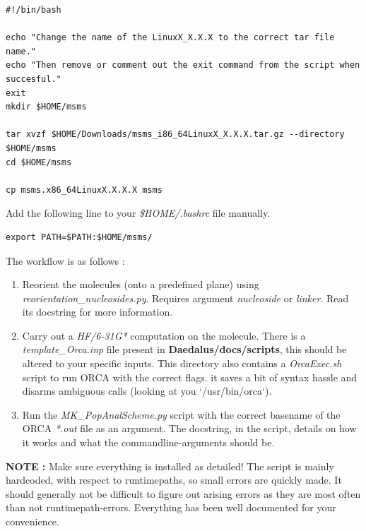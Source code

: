 \documentclass[a4paper]{article}
\begin{document}
\begin{tcolorbox}
\begin{verbatim}
#!/bin/bash

echo "Change the name of the LinuxX_X.X.X to the correct tar file name."
echo "Then remove or comment out the exit command from the script when succesful."
exit
mkdir $HOME/msms

tar xvzf $HOME/Downloads/msms_i86_64LinuxX_X.X.X.tar.gz --directory $HOME/msms 
cd $HOME/msms

cp msms.x86_64LinuxX.X.X.X msms
\end{verbatim}
\end{tcolorbox}
%
\noindent Add the following line to your \textit{\$HOME/.bashrc}  file manually.
\begin{tcolorbox}
\begin{verbatim}
export PATH=$PATH:$HOME/msms/
\end{verbatim}
\end{tcolorbox}
%
\noindent The workflow is as follows : 
\begin{enumerate}
    \item Reorient the molecules (onto a predefined plane) using \textit{reorientation\_nucleosides.py}. Requires argument \textit{nucleoside} or \textit{linker}. Read its docstring for more information.
    \item Carry out a \textit{HF/6-31G*} computation on the molecule. There is a \textit{template\_Orca.inp} file present in \textbf{Daedalus/docs/scripts}, this should be altered to your specific inputs.
        This directory also contains a \textit{OrcaExec.sh} script to run ORCA with the correct flags. it saves a bit of syntax hassle and disarms ambiguous calls (looking at you `/usr/bin/orca`).
    \item Run the \textit{MK\_PopAnalScheme.py} script with the correct basename of the ORCA \textit{*.out} file as an argument. The docstring, in the script, details on how it works and what the commandline-arguments should be.
\end{enumerate}
\vspace{3mm}
\noindent \textbf{NOTE : } Make sure everything is installed as detailed! The script is mainly hardcoded, with respect to runtimepaths, so small errors are quickly made. It should generally not be difficult to figure out arising errors as they are most often than not runtimepath-errors. Everything has been well documented for your convenience.\\
%
%
%
%
%
%
\end{document}
